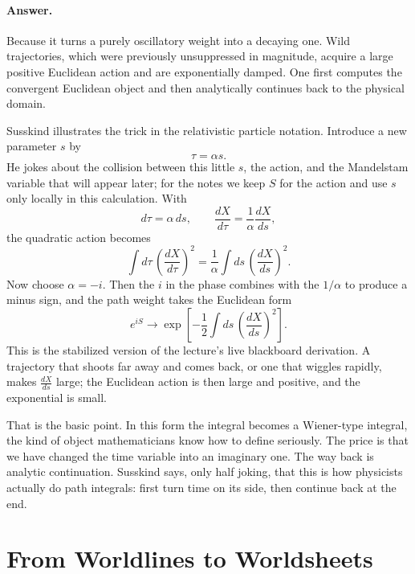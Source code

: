 \paragraph{Answer.} Because it turns a purely oscillatory weight into a decaying one. Wild trajectories, which were previously unsuppressed in magnitude, acquire a large positive Euclidean action and are exponentially damped. One first computes the convergent Euclidean object and then analytically continues back to the physical domain.

Susskind illustrates the trick in the relativistic particle notation. Introduce a new parameter \(s\) by
\begin{equation}
\tau=\alpha s.
\end{equation}
He jokes about the collision between this little \(s\), the action, and the Mandelstam variable that will appear later; for the notes we keep \(S\) for the action and use \(s\) only locally in this calculation. With
\begin{equation}
d\tau=\alpha\,ds,
\qquad
\frac{dX}{d\tau}=\frac{1}{\alpha}\frac{dX}{ds},
\end{equation}
the quadratic action becomes
\begin{equation}
\int d\tau\,\left(\frac{dX}{d\tau}\right)^2
=
\frac{1}{\alpha}\int ds\,\left(\frac{dX}{ds}\right)^2.
\end{equation}
Now choose \(\alpha=-i\). Then the \(i\) in the phase combines with the \(1/\alpha\) to produce a minus sign, and the path weight takes the Euclidean form
\begin{equation}
e^{iS}
\longrightarrow
\exp\!\left[-\frac12\int ds\,\left(\frac{dX}{ds}\right)^2\right].
\end{equation}
This is the stabilized version of the lecture's live blackboard derivation. A trajectory that shoots far away and comes back, or one that wiggles rapidly, makes \(\frac{dX}{ds}\) large; the Euclidean action is then large and positive, and the exponential is small.

That is the basic point. In this form the integral becomes a Wiener-type integral, the kind of object mathematicians know how to define seriously. The price is that we have changed the time variable into an imaginary one. The way back is analytic continuation. Susskind says, only half joking, that this is how physicists actually do path integrals: first turn time on its side, then continue back at the end.

\section{From Worldlines to Worldsheets}

